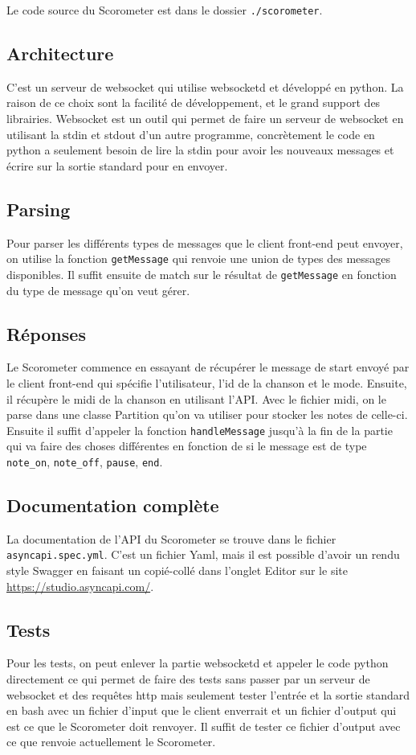 Le code source du Scorometer est dans le dossier \texttt{./scorometer}.

\subsection*{Architecture}
C’est un serveur de websocket qui utilise websocketd et développé en python. La raison de ce choix sont la facilité de développement, et le grand support des librairies. 
Websocket est un outil qui permet de faire un serveur de websocket en utilisant la stdin et stdout d’un autre programme, concrètement le code en python a seulement besoin de lire la stdin pour avoir les nouveaux messages et écrire sur la sortie standard pour en envoyer.

\subsection*{Parsing}
Pour parser les différents types de messages que le client front-end peut envoyer, on utilise la fonction \texttt{getMessage} qui renvoie une union de types des messages disponibles. Il suffit ensuite de match sur le résultat de \texttt{getMessage} en fonction du type de message qu’on veut gérer.

\subsection*{Réponses}
Le Scorometer commence en essayant de récupérer le message de start envoyé par le client front-end qui spécifie l’utilisateur, l’id de la chanson et le mode. Ensuite, il récupère le midi de la chanson en utilisant l’API. Avec le fichier midi, on le parse dans une classe Partition qu’on va utiliser pour stocker les notes de celle-ci. Ensuite il suffit d'appeler la fonction \texttt{handleMessage} jusqu'à la fin de la partie qui va faire des choses différentes en fonction de si le message est de type \verb|note_on|, \verb|note_off|, \verb|pause|, \verb|end|.

\subsection*{Documentation complète}
La documentation de l’API du Scorometer se trouve dans le fichier \verb|asyncapi.spec.yml|. C’est un fichier Yaml, mais il est possible d’avoir un rendu style Swagger en faisant un copié-collé dans l'onglet Editor sur le site \url{https://studio.asyncapi.com/}.

\subsection*{Tests}
Pour les tests, on peut enlever la partie websocketd et appeler le code python directement ce qui permet de faire des tests sans passer par un serveur de websocket et des requêtes http mais seulement tester l'entrée et la sortie standard en bash avec un fichier d’input que le client enverrait et un fichier d’output qui est ce que le Scorometer doit renvoyer. Il suffit de tester ce fichier d’output avec ce que renvoie actuellement le Scorometer.
